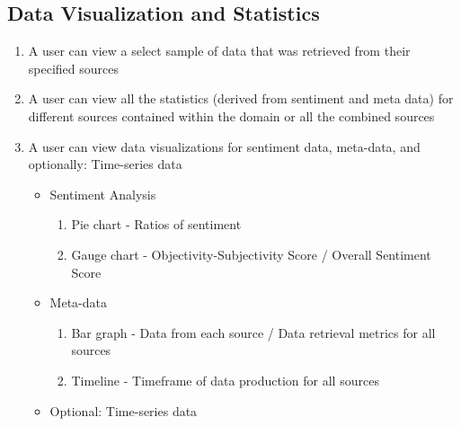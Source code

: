\documentclass[12pt]{article}
\begin{document}
\subsection{Data Visualization and Statistics}
\begin{enumerate}
  \item A user can view a select sample of data that was retrieved from their specified sources
  \item A user can view all the statistics (derived from sentiment and meta data) for different sources contained within the domain or all the combined sources
  \item A user can view data visualizations for sentiment data, meta-data, and optionally: Time-series data
        \begin{itemize}
          \item Sentiment Analysis
                \begin{enumerate}
                  \item Pie chart - Ratios of sentiment
                  \item Gauge chart - Objectivity-Subjectivity Score / Overall Sentiment Score
                \end{enumerate}
          \item Meta-data
                \begin{enumerate}
                  \item Bar graph - Data from each source / Data retrieval metrics for all sources
                  \item Timeline - Timeframe of data production for all sources
                \end{enumerate}
          \item Optional: Time-series data
        \end{itemize}
\end{enumerate}
\end{document}
